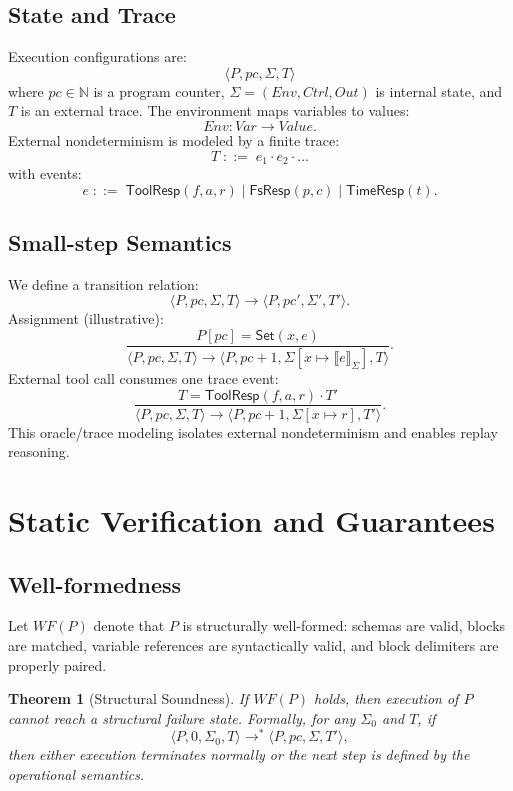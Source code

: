 \documentclass[sigplan,nonacm,10pt]{acmart}
\newtheorem{theorem}{Theorem}
\begin{document}
\subsection{State and Trace}
Execution configurations are:
\[
\langle P, pc, \Sigma, T \rangle
\]
where $pc\in\mathbb{N}$ is a program counter, $\Sigma=(Env,Ctrl,Out)$ is internal state, and $T$ is an external trace. The environment maps variables to values:
\[
Env: Var \rightarrow Value.
\]
External nondeterminism is modeled by a finite trace:
\[
T \;::=\; e_1 \cdot e_2 \cdot \dots
\]
with events:
\[
e \;::=\; \textsf{ToolResp}(f,a,r) \mid \textsf{FsResp}(p,c) \mid \textsf{TimeResp}(t).
\]

\subsection{Small-step Semantics}
We define a transition relation:
\[
\langle P, pc, \Sigma, T \rangle \rightarrow \langle P, pc', \Sigma', T' \rangle.
\]
Assignment (illustrative):
\[
\frac{P[pc] = \textsf{Set}(x,e)}
{\langle P, pc, \Sigma, T \rangle
\rightarrow
\langle P, pc+1, \Sigma[x \mapsto \llbracket e \rrbracket_\Sigma], T \rangle}.
\]
External tool call consumes one trace event:
\[
\frac{T = \textsf{ToolResp}(f,a,r)\cdot T'}
{\langle P, pc, \Sigma, T \rangle
\rightarrow
\langle P, pc+1, \Sigma[x \mapsto r], T' \rangle}.
\]
This oracle/trace modeling isolates external nondeterminism and enables replay reasoning.

\section{Static Verification and Guarantees}
\subsection{Well-formedness}
Let $WF(P)$ denote that $P$ is structurally well-formed: schemas are valid, blocks are matched, variable references are syntactically valid, and block delimiters are properly paired.

\begin{theorem}[Structural Soundness]
If $WF(P)$ holds, then execution of $P$ cannot reach a structural failure state. Formally, for any $\Sigma_0$ and $T$, if
\[
\langle P,0,\Sigma_0,T\rangle \rightarrow^* \langle P,pc,\Sigma,T'\rangle,
\]
then either execution terminates normally or the next step is defined by the operational semantics.
\end{theorem}
\end{document}
